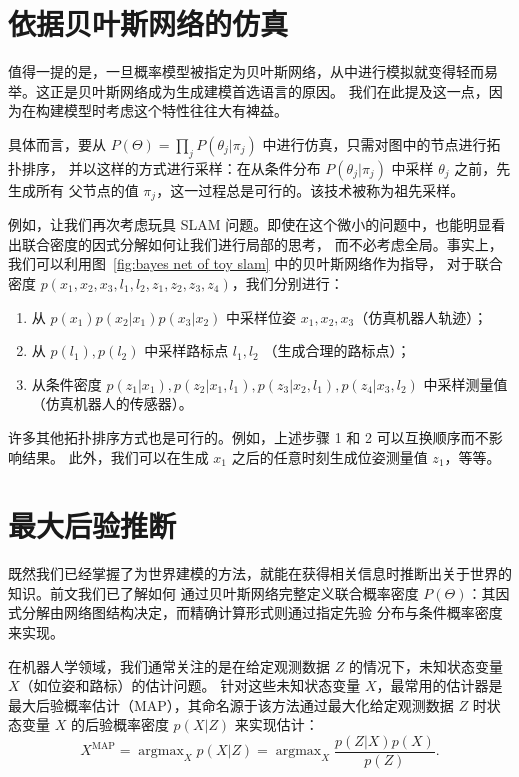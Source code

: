 \documentclass[fontset=none]{Notes}
\DeclareMathOperator*\argmax{argmax}
\begin{document}
\section{依据贝叶斯网络的仿真}

值得一提的是，一旦概率模型被指定为贝叶斯网络，从中进行模拟就变得轻而易举。这正是贝叶斯网络成为生成建模首选语言的原因。
我们在此提及这一点，因为在构建模型时考虑这个特性往往大有裨益。

具体而言，要从 $P(\Theta) =\prod_j  P(\theta_j |\pi_j )$ 中进行仿真，只需对图中的节点进行拓扑排序，
并以这样的方式进行采样：在从条件分布 $P(\theta_j |\pi_j )$ 中采样 $\theta_j$ 之前，先生成所有
父节点的值 $\pi_j$，这一过程总是可行的。该技术被称为祖先采样。

例如，让我们再次考虑玩具 SLAM 问题。即使在这个微小的问题中，也能明显看出联合密度的因式分解如何让我们进行局部的思考，
而不必考虑全局。事实上，我们可以利用图~\ref{fig:bayes net of toy slam} 中的贝叶斯网络作为指导，
对于联合密度 $p(x_1, x_2, x_3, l_1, l_2, z_1, z_2, z_3, z_4)$，我们分别进行：
\begin{enumerate}
  \item 从 $p(x_1)p(x_2|x_1)p(x_3|x_2)$ 中采样位姿 $x_1,x_2,x_3$（仿真机器人轨迹）；
  \item 从 $p(l_1),p(l_2)$ 中采样路标点 $l_1,l_2$ （生成合理的路标点）；
  \item 从条件密度 $p(z_1|x_1),p(z_2|x_1,l_1),p(z_3|x_2,l_1),p(z_4|x_3,l_2)$ 中采样测量值
  （仿真机器人的传感器）。
\end{enumerate}
许多其他拓扑排序方式也是可行的。例如，上述步骤 1 和 2 可以互换顺序而不影响结果。
此外，我们可以在生成 $x_1$ 之后的任意时刻生成位姿测量值 $z_1$，等等。

\section{最大后验推断}

既然我们已经掌握了为世界建模的方法，就能在获得相关信息时推断出关于世界的知识。前文我们已了解如何
通过贝叶斯网络完整定义联合概率密度 $P(\Theta)$：其因式分解由网络图结构决定，而精确计算形式则通过指定先验
分布与条件概率密度来实现。

在机器人学领域，我们通常关注的是在给定观测数据 $Z$ 的情况下，未知状态变量 $X$（如位姿和路标）的估计问题。
针对这些未知状态变量 $X$，最常用的估计器是最大后验概率估计（MAP），其命名源于该方法通过最大化给定观测数据
$Z$ 时状态变量 $X$ 的后验概率密度 $p(X|Z)$ 来实现估计：
\[
  X^{\mathrm{MAP}}=\argmax_X p(X|Z)=\argmax_X\frac{p(Z|X)p(X)}{p(Z)}.
\]
\end{document}
